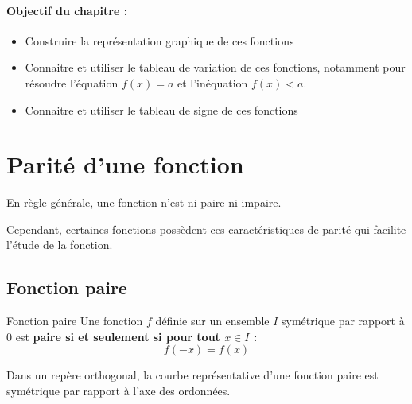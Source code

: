\documentclass[10pt,a4paper,openany,twoside]{book}
\begin{document}
	\entetegal{}
	\makeatletter
	\makeatother

	\paragraph*{Objectif du chapitre :}

	\vspace{-3mm}
	\begin{itemize}
		\item Construire la représentation graphique de ces fonctions
		\item Connaitre et utiliser le tableau de variation de ces fonctions, notamment pour résoudre l'équation $f(x)=a$ et l'inéquation $f(x)<a$.
		\item Connaitre et utiliser le tableau de signe de ces fonctions
	\end{itemize}
	\vspace{-3mm}

	\section{Parité d'une fonction}

	En règle générale, une fonction n'est ni paire ni impaire.

	\noindent Cependant, certaines fonctions possèdent ces caractéristiques de parité qui facilite l'étude de la fonction.

	\vspace{-2mm}
	\subsection{Fonction paire}

	\vspace{-1mm}
	\begin{defi}{Fonction paire}{}
	Une fonction $f$ définie sur un ensemble $I$ symétrique par rapport à $0$ est \bf{paire} si et seulement si pour tout $x \in I$ : $$f(-x)=f(x)$$
	\end{defi}

	\begin{prop}{}{}
	Dans un repère orthogonal, la courbe représentative d'une fonction paire est symétrique par rapport à l'axe des ordonnées.
	\end{prop}
\end{document}
